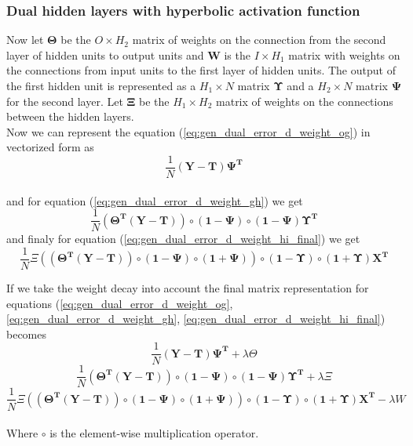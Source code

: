 \subsubsection{Dual hidden layers with hyperbolic activation function} \label{ch:mtx_dual_hidden_layer}
Now let $\mathbf{\Theta}$ be the $O \times H_{2}$ matrix of weights on the connection from the second layer of hidden units to output units and $\mathbf{W}$ is the $I \times H_{1}$ matrix with weights on the connections from input units to the first layer of hidden units. The output of the first hidden unit is represented as a $H_{1} \times N$ matrix $\mathbf{\Upsilon}$ and a $H_{2} \times N$ matrix $\mathbf{\Psi}$ for the second layer.
Let $\mathbf{\Xi}$ be the $H_{1} \times H_{2}$ matrix of weights on the connections between the hidden layers.
\\
 Now we can represent the equation (\ref{eq:gen_dual_error_d_weight_og}) in vectorized form as
\begin{displaymath}
 \frac{1}{N}(\mathbf{Y}-\mathbf{T}) \mathbf{\Psi^{T}} 
 \end{displaymath}
 \\
 and for equation (\ref{eq:gen_dual_error_d_weight_gh}) we get
 \begin{displaymath}
 \frac{1}{N}(\mathbf{\Theta^{T}}(\mathbf{Y}-\mathbf{T})) \circ (\mathbf{1} - \mathbf{\Psi}) \circ (\mathbf{1} - \mathbf{\Psi}) \mathbf{\Upsilon^{T}}
 \end{displaymath}
  and finaly for equation (\ref{eq:gen_dual_error_d_weight_hi_final}) we get
\begin{displaymath}
 \frac{1}{N}\Xi((\mathbf{\Theta^{T}}(\mathbf{Y}-\mathbf{T})) \circ (\mathbf{1} - \mathbf{\Psi}) \circ (\mathbf{1} + \mathbf{\Psi})) \circ
 (\mathbf{1} - \mathbf{\Upsilon}) \circ (\mathbf{1} + \mathbf{\Upsilon}) \mathbf{X^{T}}
 \end{displaymath}

If we take the weight decay into account the final matrix representation for equations (\ref{eq:gen_dual_error_d_weight_og}, \ref{eq:gen_dual_error_d_weight_gh}, \ref{eq:gen_dual_error_d_weight_hi_final}) becomes
\begin{displaymath}
\frac{1}{N}(\mathbf{Y}-\mathbf{T}) \mathbf{\Psi^{T}} + \lambda \Theta
 \end{displaymath}
 \begin{displaymath}
 \frac{1}{N}(\mathbf{\Theta^{T}}(\mathbf{Y}-\mathbf{T})) \circ (\mathbf{1} - \mathbf{\Psi}) \circ (\mathbf{1} - \mathbf{\Psi}) \mathbf{\Upsilon^{T}} + \lambda \Xi
\end{displaymath}
\begin{displaymath}
\frac{1}{N}\Xi((\mathbf{\Theta^{T}}(\mathbf{Y}-\mathbf{T})) \circ (\mathbf{1} - \mathbf{\Psi}) \circ (\mathbf{1} + \mathbf{\Psi})) \circ
 (\mathbf{1} - \mathbf{\Upsilon}) \circ (\mathbf{1} + \mathbf{\Upsilon}) \mathbf{X^{T}} - \lambda W
 \end{displaymath}
\\
Where $\circ$ is the element-wise multiplication operator.

%


